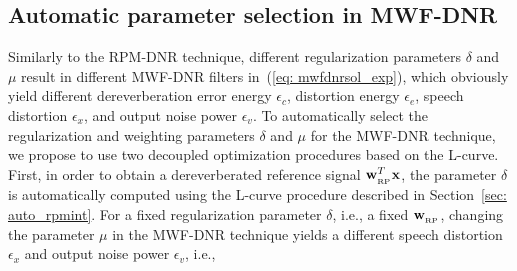 \documentclass[10pt]{IEEEtran}
\begin{document}
\subsection{Automatic parameter selection in MWF-DNR}
\label{sec: auto_mwf}
Similarly to the RPM-DNR technique, different regularization parameters $\delta$ and $\mu$ result in different MWF-DNR filters in~(\ref{eq: mwfdnrsol_exp}), which obviously yield different dereverberation error energy $\epsilon_c$, distortion energy $\epsilon_e$, speech distortion $\epsilon_x$, and output noise power $\epsilon_v$.
To automatically select the regularization and weighting parameters $\delta$ and $\mu$ for the MWF-DNR technique, we propose to use two decoupled optimization procedures based on the L-curve. 
First, in order to obtain a dereverberated reference signal $\mathbf{w}_{_{\rm RP}}^T\mathbf{x}$, the parameter $\delta$ is automatically computed using the L-curve procedure described in Section~\ref{sec: auto_rpmint}.
{{For a fixed regularization parameter $\delta$, i.e., a fixed $\mathbf{w}_{_{\rm RP}}$, changing the parameter $\mu$ in the MWF-DNR technique yields a different speech distortion $\epsilon_x$ and output noise power $\epsilon_v$, i.e.,}}
\end{document}
